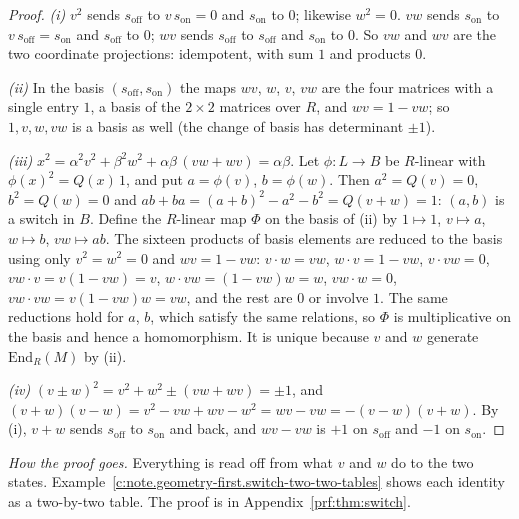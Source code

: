 \documentclass[11pt]{article}
\theoremstyle{definition}
\theoremstyle{plain}
\begin{document}
\begin{proof}
\emph{(i)} $v^{2}$ sends $s_{\mathrm{off}}$ to $v\,s_{\mathrm{on}} = 0$ and $s_{\mathrm{on}}$ to $0$; likewise $w^{2} = 0$. $vw$ sends $s_{\mathrm{on}}$ to $v\,s_{\mathrm{off}} = s_{\mathrm{on}}$ and $s_{\mathrm{off}}$ to $0$; $wv$ sends $s_{\mathrm{off}}$ to $s_{\mathrm{off}}$ and $s_{\mathrm{on}}$ to $0$. So $vw$ and $wv$ are the two coordinate projections: idempotent, with sum $1$ and products $0$.

\emph{(ii)} In the basis $(s_{\mathrm{off}}, s_{\mathrm{on}})$ the maps $wv$, $w$, $v$, $vw$ are the four matrices with a single entry $1$, a basis of the $2 \times 2$ matrices over $R$, and $wv = 1 - vw$; so $1, v, w, vw$ is a basis as well (the change of basis has determinant $\pm 1$).

\emph{(iii)} $x^{2} = \alpha^{2}v^{2} + \beta^{2}w^{2} + \alpha\beta\,(vw + wv) = \alpha\beta$. Let $\phi : L \to B$ be $R$-linear with $\phi(x)^{2} = Q(x)\,1$, and put $a = \phi(v)$, $b = \phi(w)$. Then $a^{2} = Q(v) = 0$, $b^{2} = Q(w) = 0$ and $ab + ba = (a + b)^{2} - a^{2} - b^{2} = Q(v + w) = 1$: $(a, b)$ is a switch in $B$. Define the $R$-linear map $\Phi$ on the basis of (ii) by $1 \mapsto 1$, $v \mapsto a$, $w \mapsto b$, $vw \mapsto ab$. The sixteen products of basis elements are reduced to the basis using only $v^{2} = w^{2} = 0$ and $wv = 1 - vw$: $v \cdot w = vw$, $w \cdot v = 1 - vw$, $v \cdot vw = 0$, $vw \cdot v = v(1 - vw) = v$, $w \cdot vw = (1 - vw)w = w$, $vw \cdot w = 0$, $vw \cdot vw = v(1 - vw)w = vw$, and the rest are $0$ or involve $1$. The same reductions hold for $a$, $b$, which satisfy the same relations, so $\Phi$ is multiplicative on the basis and hence a homomorphism. It is unique because $v$ and $w$ generate $\mathrm{End}_{R}(M)$ by (ii).

\emph{(iv)} $(v \pm w)^{2} = v^{2} + w^{2} \pm (vw + wv) = \pm 1$, and $(v + w)(v - w) = v^{2} - vw + wv - w^{2} = wv - vw = -(v - w)(v + w)$. By (i), $v + w$ sends $s_{\mathrm{off}}$ to $s_{\mathrm{on}}$ and back, and $wv - vw$ is $+1$ on $s_{\mathrm{off}}$ and $-1$ on $s_{\mathrm{on}}$.

\end{proof}

\label{c:note.geometry-first.setting-switch-what-bit-does-2}
\noindent\emph{How the proof goes.} Everything is read off from what $v$ and $w$ do to the two states. Example~\ref{c:note.geometry-first.switch-two-two-tables} shows each identity as a two-by-two table. The proof is in Appendix~\ref{prf:thm:switch}.
\end{document}
